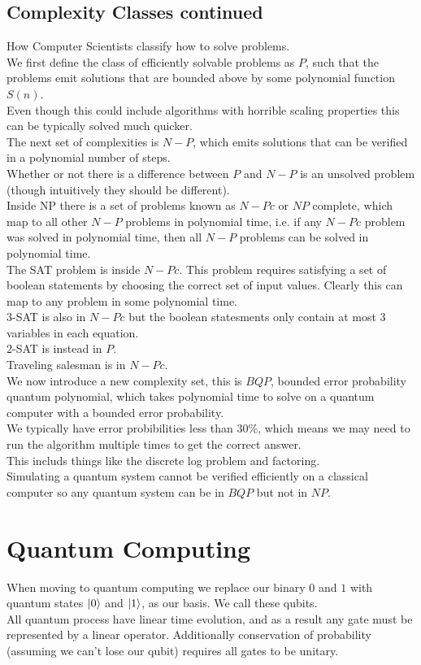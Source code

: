 \subsection{Complexity Classes continued}
How Computer Scientists classify how to solve problems.\\
We first define the class of efficiently solvable problems as $P$, such that the problems emit solutions that are bounded above by some polynomial function $S(n)$. \\
Even though this could include algorithms with horrible scaling properties this can be typically solved much quicker. \\
The next set of complexities is $N-P$, which emits solutions that can be verified in a polynomial number of steps. \\
Whether or not there is a difference between $P$ and $N-P$ is an unsolved problem (though intuitively they should be different). \\
Inside NP there is a set of problems known as $N-Pc$ or $NP$ complete, which map to all other $N-P$ problems in polynomial time, i.e. if any $N-Pc$ problem was solved in polynomial time, then all $N-P$ problems can be solved in polynomial time. \\
The SAT problem is inside $N-Pc$. This problem requires satisfying a set of boolean statements by choosing the correct set of input values. Clearly this can map to any problem in some polynomial time. \\
3-SAT is also in $N-Pc$ but the boolean statesments only contain at most 3 variables in each equation. \\
2-SAT is instead in $P$. \\
Traveling salesman is in $N-Pc$. \\
We now introduce a new complexity set, this is $BQP$, bounded error probability quantum polynomial, which takes polynomial time to solve on a quantum computer with a bounded error probability. \\
We typically have error probibilities less than $30\%$, which means we may need to run the algorithm multiple times to get the correct answer. \\
This includs things like the discrete log problem and factoring. \\
Simulating a quantum system cannot be verified efficiently on a classical computer so any quantum system can be in $BQP$ but not in $NP$. \\
\section{Quantum Computing}
When moving to quantum computing we replace our binary $0$ and $1$ with quantum states $\ket{0}$ and $\ket{1}$, as our basis. We call these qubits. \\
All quantum process have linear time evolution, and as a result any gate must be represented by a linear operator. Additionally conservation of probability (assuming we can't lose our qubit) requires all gates to be unitary.
